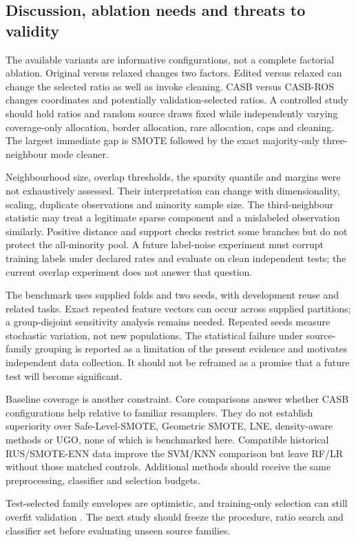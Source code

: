 \documentclass[conference]{IEEEtran}
\begin{document}
\subsection{Discussion, ablation needs and threats to validity}
The available variants are informative configurations, not a complete factorial ablation. Original versus relaxed changes two factors. Edited versus relaxed can change the selected ratio as well as invoke cleaning. CASB versus CASB-ROS changes coordinates and potentially validation-selected ratios. A controlled study should hold ratios and random source draws fixed while independently varying coverage-only allocation, border allocation, rare allocation, caps and cleaning. The largest immediate gap is SMOTE followed by the exact majority-only three-neighbour mode cleaner.

Neighbourhood size, overlap thresholds, the sparsity quantile and margins were not exhaustively assessed. Their interpretation can change with dimensionality, scaling, duplicate observations and minority sample size. The third-neighbour statistic may treat a legitimate sparse component and a mislabeled observation similarly. Positive distance and support checks restrict some branches but do not protect the all-minority pool. A future label-noise experiment must corrupt training labels under declared rates and evaluate on clean independent tests; the current overlap experiment does not answer that question.

The benchmark uses supplied folds and two seeds, with development reuse and related tasks. Exact repeated feature vectors can occur across supplied partitions; a group-disjoint sensitivity analysis remains needed. Repeated seeds measure stochastic variation, not new populations. The statistical failure under source-family grouping is reported as a limitation of the present evidence and motivates independent data collection. It should not be reframed as a promise that a future test will become significant.

Baseline coverage is another constraint. Core comparisons answer whether CASB configurations help relative to familiar resamplers. They do not establish superiority over Safe-Level-SMOTE, Geometric SMOTE, LNE, density-aware methods or UGO, none of which is benchmarked here. Compatible historical RUS/SMOTE-ENN data improve the SVM/KNN comparison but leave RF/LR without those matched controls. Additional methods should receive the same preprocessing, classifier and selection budgets.

Test-selected family envelopes are optimistic, and training-only selection can still overfit validation \citep{cawley2010}. The next study should freeze the procedure, ratio search and classifier set before evaluating unseen source families.
\end{document}
